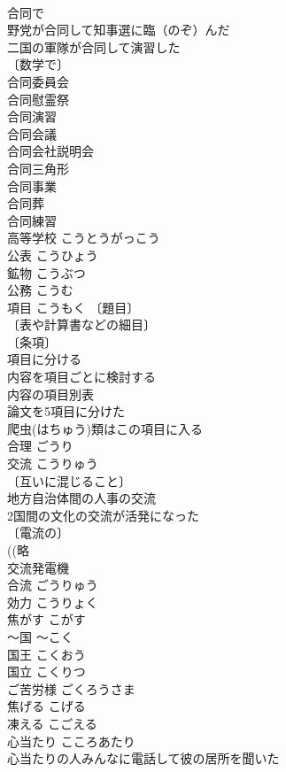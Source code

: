 \documentclass[8pt]{extreport}
\begin{document}
\begin{CJK}{UTF8}{min}
\\	合同で 
\\	野党が合同して知事選に臨（のぞ）んだ 
\\	二国の軍隊が合同して演習した 
\\	〔数学で〕
\\	合同委員会 
\\	合同慰霊祭 
\\	合同演習 
\\	合同会議 
\\	合同会社説明会 
\\	合同三角形 
\\	合同事業 
\\	合同葬 
\\	合同練習 
\\	高等学校	こうとうがっこう	
\\	公表	こうひょう	
\\	鉱物	こうぶつ	
\\	公務	こうむ	
\\	項目	こうもく	〔題目〕
\\	〔表や計算書などの細目〕
\\	〔条項〕
\\	項目に分ける 
\\	内容を項目ごとに検討する 
\\	内容の項目別表 
\\	論文を5項目に分けた 
\\	爬虫(はちゅう)類はこの項目に入る 
\\	合理	ごうり	
\\	交流	こうりゅう	
\\	〔互いに混じること〕
\\	地方自治体間の人事の交流 
\\	2国間の文化の交流が活発になった 
\\	〔電流の〕
\\	((略
\\	交流発電機 
\\	合流	ごうりゅう	
\\	効力	こうりょく	
\\	焦がす	こがす	
\\	～国	～こく	
\\	国王	こくおう	
\\	国立	こくりつ	
\\	ご苦労様	ごくろうさま	
\\	焦げる	こげる	
\\	凍える	こごえる	
\\	心当たり	こころあたり	
\\	心当たりの人みんなに電話して彼の居所を聞いた 

\end{CJK}
\end{document}
